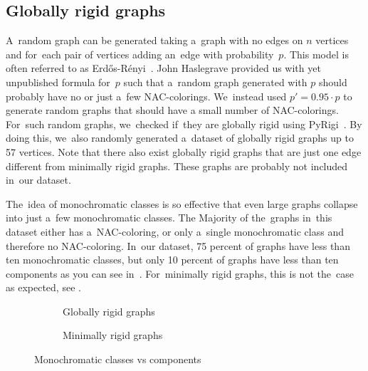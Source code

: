 \subsection*{Globally rigid graphs}

A~random graph can be generated taking a~graph with no edges on \( n \) vertices
and for~each pair of vertices adding an~edge with probability~\( p \).
This model is often referred to as Erdős-Rényi~\cite{random_gnp}.
%
John Haslegrave provided us with yet unpublished formula for~\( p \)
such that a~random graph generated with \( p \)
should probably have no or just a~few NAC-colorings.
%
We~instead used \( p' = 0.95\cdot p \) to generate random graphs that
should have a small number of NAC-colorings.
For~such random graphs, we~checked if~they are globally rigid using PyRigi~\cite{pyrigi}.
%
By doing this, we~also randomly generated a~dataset of globally rigid graphs
up to 57 vertices.
%
Note that there also exist globally rigid graphs
that are just one edge different from minimally rigid graphs.
These graphs are probably not included in~our dataset.

The~idea of monochromatic classes is so effective
that even large graphs collapse into just a~few monochromatic classes.
The Majority of the~graphs in~this dataset either has a~NAC-coloring,
or only a~single monochromatic class and therefore no NAC-coloring.
In~our dataset, 75 percent of graphs have less than ten	monochromatic classes,
but only 10 percent of graphs have less than ten \trcon{} components
as you can see in~.
For~minimally rigid graphs, this is not the~case as expected, see
.
%
\begin{figure}[h!]
	\centering
	\begin{subfigure}{0.48\textwidth}
		\centering
		\scalebox{0.6}{}
		\caption[Monoch. classes vs tri. conn. components for~globally rigid]{%
			\centering Globally rigid graphs}%
		\label{fig:monochrom_vs_triangle_globally_rigid}
	\end{subfigure}
	\hfill
	\begin{subfigure}{0.48\textwidth}
		\centering
		\scalebox{0.6}{}
		\caption[Monoch. classes vs tri. conn. components for~minimally rigid]{%
			\centering Minimally rigid graphs}%
		\label{fig:monochrom_vs_triangle_minimally_rigid}
	\end{subfigure}
	\caption{Monochromatic classes vs \trcon{} components}%
	\label{fig:monochrom_vs_triangle}
\end{figure}


